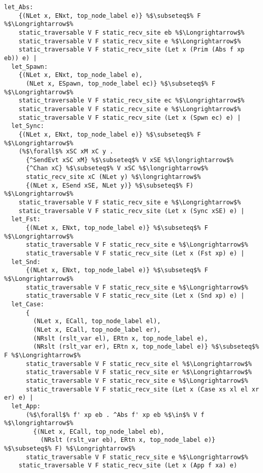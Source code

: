 \documentclass{article}
\begin{document}
\begin{lstlisting}[style=codestyle1, escapechar=\%]
  let_Abs:
    {(NLet x, ENxt, top_node_label e)} %$\subseteq$% F %$\Longrightarrow$%
    static_traversable V F static_recv_site eb %$\Longrightarrow$%
    static_traversable V F static_recv_site e %$\Longrightarrow$%
    static_traversable V F static_recv_site (Let x (Prim (Abs f xp eb)) e) |
  let_Spawn:
    {(NLet x, ENxt, top_node_label e),
      (NLet x, ESpawn, top_node_label ec)} %$\subseteq$% F %$\Longrightarrow$%
    static_traversable V F static_recv_site ec %$\Longrightarrow$%
    static_traversable V F static_recv_site e %$\Longrightarrow$%
    static_traversable V F static_recv_site (Let x (Spwn ec) e) |
  let_Sync:
    {(NLet x, ENxt, top_node_label e)} %$\subseteq$% F %$\Longrightarrow$%
    (%$\forall$% xSC xM xC y .
      {^SendEvt xSC xM} %$\subseteq$% V xSE %$\longrightarrow$%
      {^Chan xC} %$\subseteq$% V xSC %$\longrightarrow$%
      static_recv_site xC (NLet y) %$\longrightarrow$%
      {(NLet x, ESend xSE, NLet y)} %$\subseteq$% F) %$\Longrightarrow$%
    static_traversable V F static_recv_site e %$\Longrightarrow$%
    static_traversable V F static_recv_site (Let x (Sync xSE) e) |
  let_Fst:
      {(NLet x, ENxt, top_node_label e)} %$\subseteq$% F %$\Longrightarrow$%
      static_traversable V F static_recv_site e %$\Longrightarrow$%
      static_traversable V F static_recv_site (Let x (Fst xp) e) |
  let_Snd:
      {(NLet x, ENxt, top_node_label e)} %$\subseteq$% F %$\Longrightarrow$%
      static_traversable V F static_recv_site e %$\Longrightarrow$%
      static_traversable V F static_recv_site (Let x (Snd xp) e) |
  let_Case:
      {
        (NLet x, ECall, top_node_label el),
        (NLet x, ECall, top_node_label er),
        (NRslt (rslt_var el), ERtn x, top_node_label e),
        (NRslt (rslt_var er), ERtn x, top_node_label e)} %$\subseteq$% F %$\Longrightarrow$%
      static_traversable V F static_recv_site el %$\Longrightarrow$%
      static_traversable V F static_recv_site er %$\Longrightarrow$%
      static_traversable V F static_recv_site e %$\Longrightarrow$%
      static_traversable V F static_recv_site (Let x (Case xs xl el xr er) e) |
  let_App:
      (%$\forall$% f' xp eb . ^Abs f' xp eb %$\in$% V f %$\longrightarrow$%
        {(NLet x, ECall, top_node_label eb),
          (NRslt (rslt_var eb), ERtn x, top_node_label e)} %$\subseteq$% F) %$\Longrightarrow$%
      static_traversable V F static_recv_site e %$\Longrightarrow$%
    static_traversable V F static_recv_site (Let x (App f xa) e)

  \end{lstlisting}
\end{document}

